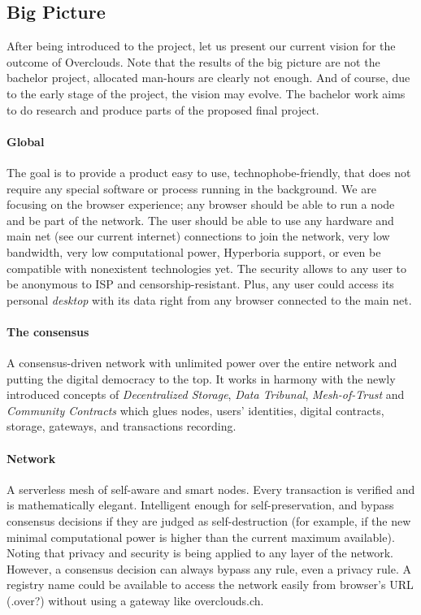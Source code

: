 
\subsection{Big Picture}
After being introduced to the project, let us present our current vision for the outcome of Overclouds. Note that the results of the big picture are not the bachelor project, allocated man-hours are clearly not enough. And of course, due to the early stage of the project, the vision may evolve. The bachelor work aims to do research and produce parts of the proposed final project.

\paragraph{Global}
The goal is to provide a product easy to use, technophobe-friendly, that does not require any special software or process running in the background. We are focusing on the browser experience; any browser should be able to run a node and be part of the network. The user should be able to use any hardware and main net (see our current internet) connections to join the network, very low bandwidth, very low computational power, Hyperboria\cite{HypeHyperboriaWhitepaper} support, or even be compatible with nonexistent technologies yet. The security allows to any user to be anonymous to ISP and censorship-resistant. Plus, any user could access its personal \textit{desktop} with its data right from any browser connected to the main net.

\paragraph{The consensus}
A consensus-driven network with unlimited power over the entire network and putting the digital democracy to the top. It works in harmony with the newly introduced concepts of \textit{Decentralized Storage}, \textit{Data Tribunal}, \textit{Mesh-of-Trust} and \textit{Community Contracts} which glues nodes, users' identities, digital contracts, storage, gateways, and transactions recording.

\paragraph{Network}
A serverless mesh of self-aware and smart nodes. Every transaction is verified and is mathematically elegant. Intelligent enough for self-preservation, and bypass consensus decisions if they are judged as self-destruction (for example, if the new minimal computational power is higher than the current maximum available). Noting that privacy and security is being applied to any layer of the network. However, a consensus decision can always bypass any rule, even a privacy rule. A registry name could be available to access the network easily from browser's URL (.over?) without using a gateway like overclouds.ch.

